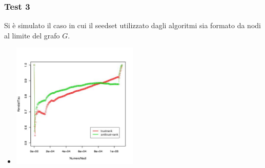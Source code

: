 \documentclass{beamer}
\begin{document}
\begin{frame}
 \frametitle{Test 3}
 Si è  simulato il caso in cui il seedset  utilizzato dagli algoritmi sia formato da nodi al limite del grafo \(G\).
 \begin{itemize}
  \item<2-> \begin{center}
 \includegraphics[height=6cm]{immagini/test3/coplotTrustAnti_Mode1_set3776_62}
\end{center}
 \end{itemize}
\end{frame}
\end{document}
